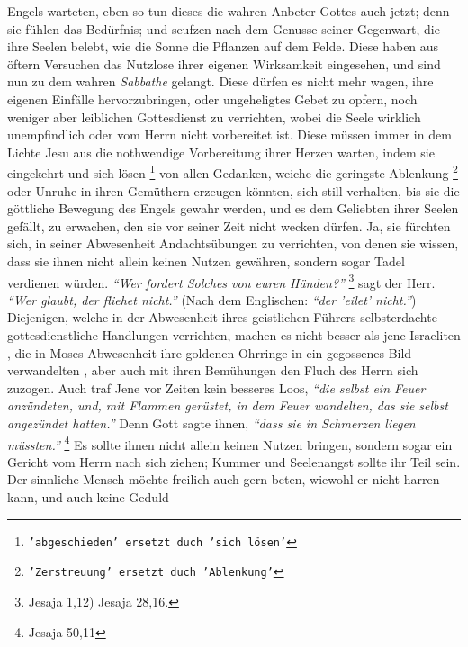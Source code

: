 Engels warteten, eben so tun dieses die wahren Anbeter Gottes auch jetzt; denn
sie fühlen das Bedürfnis; und seufzen nach dem Genusse seiner Gegenwart, die
ihre Seelen belebt, wie die Sonne die Pflanzen auf dem Felde. Diese haben aus
öftern Versuchen das Nutzlose ihrer eigenen Wirksamkeit eingesehen, und sind nun
zu dem wahren \textit{Sabbathe}  gelangt. Diese dürfen es nicht
mehr wagen, ihre
eigenen Einfälle hervorzubringen, oder ungeheligtes Gebet zu opfern, noch
weniger aber leiblichen Gottesdienst zu verrichten, wobei die Seele wirklich
unempfindlich oder vom Herrn nicht vorbereitet ist. Diese müssen immer in dem
Lichte Jesu  aus die nothwendige Vorbereitung ihrer Herzen
warten, indem sie
eingekehrt und sich lösen \footnote{\texttt{'abgeschieden' ersetzt duch 'sich
lösen'}} von allen Gedanken, weiche die geringste Ablenkung
\footnote{\texttt{'Zerstreuung' ersetzt duch 'Ablenkung'}}
oder Unruhe in ihren Gemüthern erzeugen könnten, sich still verhalten, bis sie
die göttliche Bewegung des Engels gewahr werden, und es dem Geliebten ihrer
Seelen gefällt, zu erwachen, den sie vor seiner Zeit nicht wecken dürfen. Ja,
sie fürchten sich, in seiner Abwesenheit Andachtsübungen zu verrichten, von
denen sie wissen, dass sie ihnen nicht allein keinen Nutzen gewähren, sondern
sogar Tadel verdienen würden.
\textit{"`Wer fordert Solches von euren Händen?"'}
\footnote{Jesaja 1,12) Jesaja 28,16.}
sagt der Herr.
\textit{"`Wer glaubt, der fliehet nicht."'} (Nach dem Englischen: \textit{"`der
'eilet' nicht."'}) Diejenigen,
welche in der Abwesenheit ihres geistlichen Führers selbsterdachte
gottesdienstliche Handlungen verrichten, machen es nicht besser als jene
Israeliten , die in Moses 
Abwesenheit ihre goldenen Ohrringe in ein
gegossenes Bild verwandelten , aber auch mit ihren
Bemühungen den Fluch  des Herrn sich zuzogen. Auch traf Jene vor
Zeiten kein besseres Loos,
\textit{"`die selbst ein Feuer anzündeten, und, mit Flammen gerüstet, in dem
Feuer wandelten, das sie
selbst angezündet hatten."'} Denn Gott sagte ihnen,
\textit{"`dass sie in Schmerzen liegen müssten."'}
\footnote{Jesaja 50,11}
Es sollte ihnen nicht allein keinen
Nutzen bringen, sondern sogar ein Gericht vom Herrn nach sich ziehen; Kummer und
Seelenangst sollte ihr Teil sein. Der sinnliche Mensch  möchte freilich auch
gern beten, wiewohl er nicht harren kann, und auch keine Geduld 
